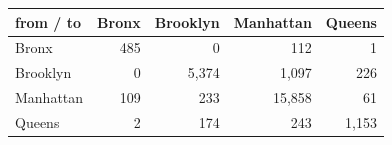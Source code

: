 \begin{tabular}{lrrrr}
\toprule
\textbf{from / to} & \textbf{Bronx} & \textbf{Brooklyn} & \textbf{Manhattan} & \textbf{Queens} \\
\midrule
Bronx & 485 & 0 & 112 & 1 \\
Brooklyn & 0 & 5,374 & 1,097 & 226 \\
Manhattan & 109 & 233 & 15,858 & 61 \\
Queens & 2 & 174 & 243 & 1,153 \\
\bottomrule
\end{tabular}
